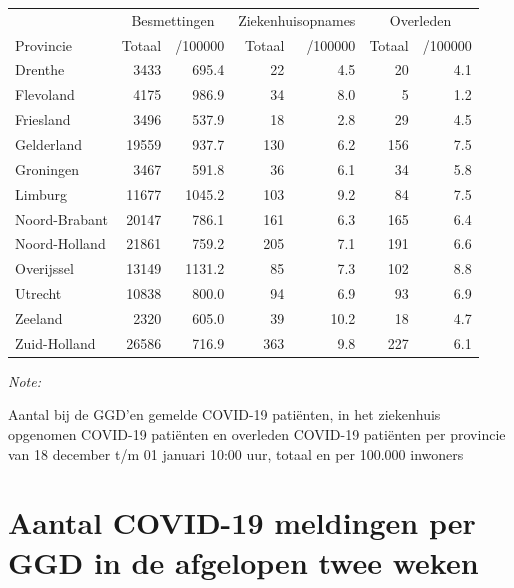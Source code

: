 \documentclass[
  english,
  man,floatsintext]{apa6}
\begin{document}
\begin{table}[H]
\centering
\begin{threeparttable}
\begin{tabular}{lrrrrrr}
\toprule
\multicolumn{1}{c}{ } & \multicolumn{2}{c}{Besmettingen} & \multicolumn{2}{c}{Ziekenhuisopnames} & \multicolumn{2}{c}{Overleden} \\
\cmidrule(l{3pt}r{3pt}){2-3} \cmidrule(l{3pt}r{3pt}){4-5} \cmidrule(l{3pt}r{3pt}){6-7}
Provincie & Totaal & /100000 & Totaal & /100000 & Totaal & /100000\\
\midrule
Drenthe & 3433 & 695.4 & 22 & 4.5 & 20 & 4.1\\
Flevoland & 4175 & 986.9 & 34 & 8.0 & 5 & 1.2\\
Friesland & 3496 & 537.9 & 18 & 2.8 & 29 & 4.5\\
Gelderland & 19559 & 937.7 & 130 & 6.2 & 156 & 7.5\\
Groningen & 3467 & 591.8 & 36 & 6.1 & 34 & 5.8\\
Limburg & 11677 & 1045.2 & 103 & 9.2 & 84 & 7.5\\
Noord-Brabant & 20147 & 786.1 & 161 & 6.3 & 165 & 6.4\\
Noord-Holland & 21861 & 759.2 & 205 & 7.1 & 191 & 6.6\\
Overijssel & 13149 & 1131.2 & 85 & 7.3 & 102 & 8.8\\
Utrecht & 10838 & 800.0 & 94 & 6.9 & 93 & 6.9\\
Zeeland & 2320 & 605.0 & 39 & 10.2 & 18 & 4.7\\
Zuid-Holland & 26586 & 716.9 & 363 & 9.8 & 227 & 6.1\\
\bottomrule
\end{tabular}
\begin{tablenotes}
\item \textit{Note: } 
\item Aantal bij de GGD’en gemelde COVID-19 patiënten, in het ziekenhuis opgenomen COVID-19 patiënten en overleden COVID-19 patiënten per provincie van 18 december t/m 01 januari 10:00 uur, totaal en per 100.000 inwoners
\end{tablenotes}
\end{threeparttable}
\end{table}

\newpage

\hypertarget{aantal-covid-19-meldingen-per-ggd-in-de-afgelopen-twee-weken}{%
\section{Aantal COVID-19 meldingen per GGD in de afgelopen twee weken}\label{aantal-covid-19-meldingen-per-ggd-in-de-afgelopen-twee-weken}}
\end{document}
